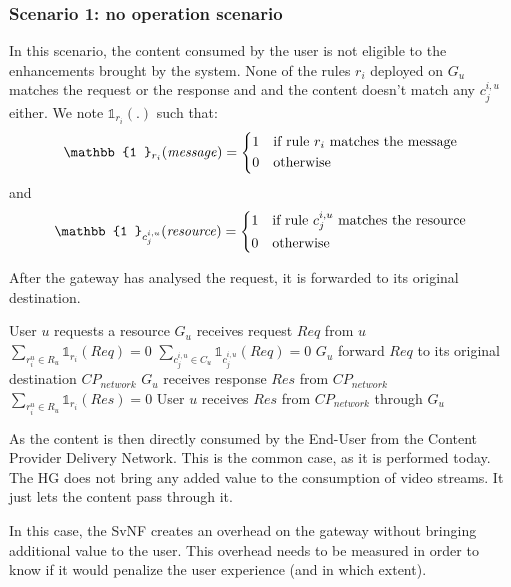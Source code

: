 \subsubsection*{Scenario 1: no operation scenario}

In this scenario, the content consumed by the user is not eligible to the enhancements brought by the system. None of the rules $r_{i}$ deployed on $G_{u}$ matches the request or the response and and the content doesn't match any $c^{i,u}_{j}$ either. We note $\mathbb{1}_{r_{i}}(.)$ such that:
\[
    \mathbb{1 }_{r_{i}}(\mathit{message})= 
\begin{dcases}
    1& \text{if rule $r_{i}$ matches the message} \\
    0              & \text{otherwise}
\end{dcases}
\]
and 
\[
    \mathbb{1 }_{c^{i,u}_{j}}(\mathit{resource})= 
\begin{dcases}
    1& \text{if rule $c^{i,u}_{j}$ matches the resource} \\
    0              & \text{otherwise}
\end{dcases}
\]

After the gateway has analysed the request, it is forwarded to its original destination.

\begin{algorithmic}[1]
	
\STATE User $u$ requests a resource
\STATE $G_{u}$ receives request $\mathit{Req}$ from $u$
\STATE \( \sum_{r^{u}_{i}\in R_{u}}{\mathbb{1}_{r_{i}}(\mathit{Req})}=0 \){}
\STATE \( \sum_{c^{i,u}_{j}\in C_{u}}{\mathbb{1}_{c^{i,u}_{j}}(\mathit{Req})}=0 \){}
\STATE $G_{u}$ forward $\mathit{Req}$ to its original destination \(\mathit{CP}_{\mathit{network}}\)
\STATE $G_{u}$ receives response $\mathit{Res}$ from \(\mathit{CP}_{\mathit{network}}\)
\STATE \( \sum_{r^{u}_{i}\in R_{u}}{\mathbb{1}_{r_{i}}(\mathit{Res})}=0 \)
\STATE User $u$ receives $\mathit{Res}$ from \(\mathit{CP}_{\mathit{network}}\) through $G_{u}$
\end{algorithmic}


As the content is then directly consumed by the End-User from the Content Provider Delivery Network.
This is the common case, as it is performed today. The HG does not bring any added value to the consumption of video streams. It just lets the content pass through it.

In this case, the SvNF creates an overhead on the gateway without bringing additional value to the user.
This overhead needs to be measured in order to know if it would penalize the user experience (and in which extent).

